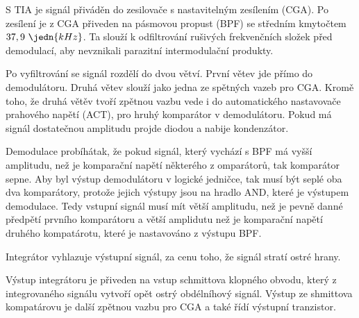 S TIA je signál přiváděn do zesilovače s nastavitelným zesílením (CGA). Po zesílení je z CGA přiveden na pásmovou propust (BPF) se středním kmytočtem $37,9~\jedn{kHz}$. Ta slouží k odfiltrování rušivých frekvenčních složek před demodulací, aby nevznikali parazitní intermodulační produkty.

Po vyfiltrování se signál rozdělí do dvou větví. První větev jde přímo do demodulátoru. Druhá větev slouží jako jedna ze spětných vazeb pro CGA. Kromě toho, že druhá větěv tvoří zpětnou vazbu vede i do automatického nastavovače prahového napětí (ACT), pro hruhý komparátor v demodulátoru. Pokud má signál dostatečnou amplitudu projde diodou a nabije kondenzátor.

Demodulace probíhátak, že pokud signál, který vychází s BPF má vyšší amplitudu, než je komparační napětí některého z omparátorů, tak komparátor sepne. Aby byl výstup demodulátoru v logické jedničce, tak musí být seplé oba dva komparátory, protože jejich výstupy jsou na hradlo AND, které je výstupem demodulace. Tedy vstupní signál musí mít větší amplitudu, než je pevně danné předpětí prvního komparátoru a větší amplidutu než je komparační napětí druhého kompatárotu, které je nastavováno z výstupu BPF.

Integrátor vyhlazuje výstupní signál, za cenu toho, že signál stratí ostré hrany.

Výstup integrátoru je přiveden na vstup schmittova klopného obvodu, který z integrovaného signálu vytvoří opět ostrý obdélníhový signál. Výstup ze shmittova kompatárovu je další zpětnou vazbu pro CGA a také řídí výstupní tranzistor.
